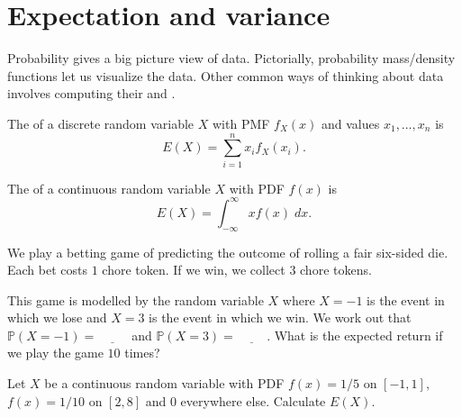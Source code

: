 \documentclass[../main.tex]{subfiles}
\begin{document}
 \section{Expectation and variance}

Probability gives a big picture view of data. Pictorially, probability mass/density functions let us visualize the data. Other common ways of thinking about data involves computing their  and . 

\begin{definition}[expectation]
  The  of a discrete random variable \(X\) with PMF \(f_{X}(x)\) and values \(x_{1}, \ldots, x_{n}\) is
  \begin{equation} \label{eq:expectation-discrete}
    E(X) = \sum_{i = 1}^{n} x_{i} f_{X}(x_{i}).
  \end{equation}

  The  of a continuous random variable \(X\) with PDF \(f(x)\) is
  \begin{equation} \label{eq:expectation-continuous}
    E(X) = \int_{-\infty}^{\infty} x f(x) \;dx.
  \end{equation}
\end{definition}

\begin{example} \label{ex:variance-discrete-betting}
  We play a betting game of predicting the outcome of rolling a fair six-sided die.  Each bet costs \(1\) chore token. If we win, we collect \(3\) chore tokens.

  This game is modelled by the random variable \(X\) where \(X = -1\) is the event in which we lose and \(X = 3\) is the event in which we win. We work out that \(\mathbb{P}(X = -1) = \underline{\hspace{1cm}}\) and \(\mathbb{P}(X = 3) = \underline{\hspace{1cm}}\).  What is the expected return if we play the game \(10\) times?

\end{example}

\begin{example} \label{ex:variance-continuous-uniform}
  Let \(X\) be a continuous random variable with PDF \(f(x) = 1/5\) on \([-1, 1]\), \(f(x) = 1/10\) on \([2,8]\) and \(0\) everywhere else.  Calculate \(E(X)\).

\end{example}
\clearpage
\end{document}
